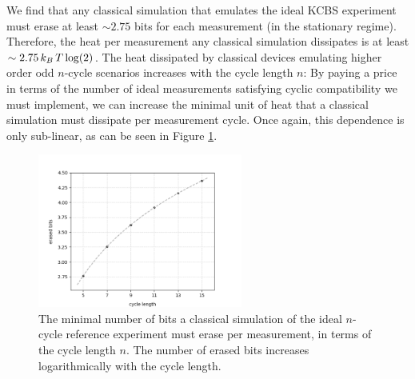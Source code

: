 We find that any classical simulation that emulates the ideal KCBS experiment must erase at least $\sim 2.75$ bits for each measurement (in the stationary regime).
Therefore, the heat per measurement any classical simulation dissipates is at least $\sim 2.75\thinspace k_B\thinspace T \log(2)$. The heat dissipated by classical devices emulating higher order odd $n$-cycle scenarios increases with the cycle length $n$: By paying a price in terms of the number of ideal measurements satisfying cyclic compatibility we must implement, we can increase the minimal unit of heat that a classical simulation must dissipate per measurement cycle. Once again, this dependence is only sub-linear, as can be seen in Figure \ref{fig:erasedbits}.

\begin{figure}
    \centering
    \includegraphics[width=0.6\textwidth]{images/erasedbits.png}
    \caption{The minimal number of bits a classical simulation of the ideal $n$-cycle reference experiment must erase per measurement, in terms of the cycle length $n$. The number of erased bits increases logarithmically with the cycle length.}
    \label{fig:erasedbits}
\end{figure}
